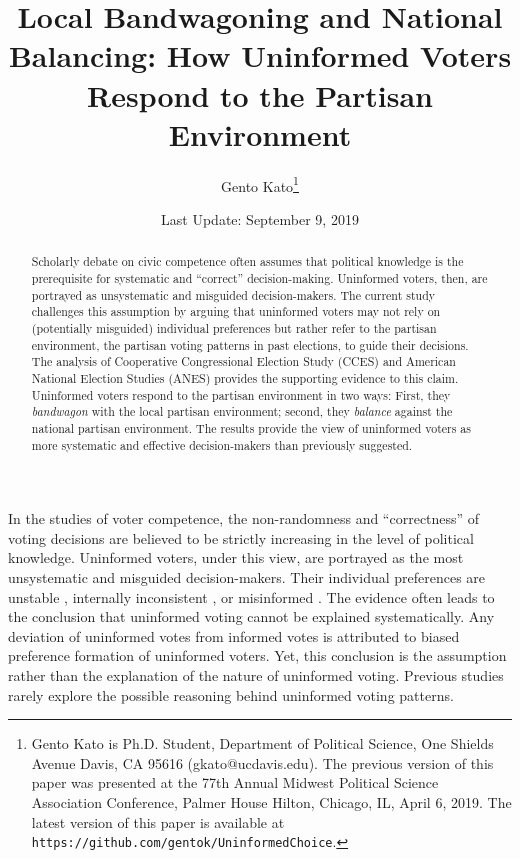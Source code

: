 \documentclass[letterpaper, 12pt]{article}
\title{Local Bandwagoning and National Balancing: How Uninformed Voters Respond to the Partisan Environment} %
\author{Gento Kato\thanks{Gento Kato is Ph.D. Student, Department of Political Science, One Shields Avenue Davis, CA 95616 (gkato@ucdavis.edu). The previous version of this paper was presented at the 77th Annual Midwest Political Science Association Conference, Palmer House Hilton, Chicago, IL, April 6, 2019. The latest version of this paper is available at \texttt{https://github.com/gentok/UninformedChoice}.}}
\affil{University of California, Davis}
\date{Last Update: September 9, 2019}
\begin{document}
\begin{titlepage}
    
    \singlespace
    \maketitle
    \thispagestyle{empty}
    
    
    \begin{abstract}
        Scholarly debate on civic competence often assumes that political knowledge is the prerequisite for systematic and ``correct'' decision-making. Uninformed voters, then, are portrayed as unsystematic and misguided decision-makers. The current study challenges this assumption by arguing that uninformed voters may not rely on (potentially misguided) individual preferences but rather refer to the partisan environment, the partisan voting patterns in past elections, to guide their decisions. The analysis of Cooperative Congressional Election Study (CCES) and American National Election Studies (ANES) provides the supporting evidence to this claim. Uninformed voters respond to the partisan environment in two ways: First, they \textit{bandwagon} with the local partisan environment; second, they \textit{balance} against the national partisan environment. The results provide the view of uninformed voters as more systematic and effective decision-makers than previously suggested.
    \end{abstract}
    \end{titlepage}
    
    \clearpage
    \doublespace

    \par In the studies of voter competence, the non-randomness and ``correctness'' of voting decisions are believed to be strictly increasing in the level of political knowledge. Uninformed voters, under this view, are portrayed as the most unsystematic and misguided decision-makers. Their individual preferences are unstable \citep{Converse1964thna, Zaller1992thna}, internally inconsistent \citep{Broockman2016apto}, or misinformed \citep{Kuklinski2000mian, Fowler2014thpo}. The evidence often leads to the conclusion that uninformed voting cannot be explained systematically. Any deviation of uninformed votes from informed votes \citep{Bartels1996unvo} is attributed to biased preference formation of uninformed voters. Yet, this conclusion is the assumption rather than the explanation of the nature of uninformed voting. Previous studies rarely explore the possible reasoning behind uninformed voting patterns.
    
\end{document}
